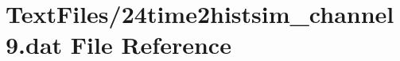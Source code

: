 \hypertarget{24time2histsim__channel9_8dat}{}\section{Text\+Files/24time2histsim\+\_\+channel9.dat File Reference}
\label{24time2histsim__channel9_8dat}
